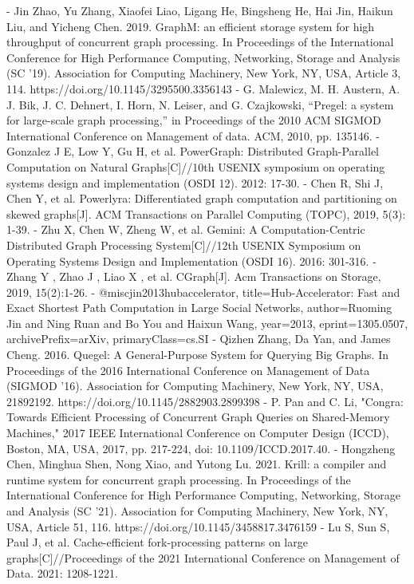 \documentclass[lettersize,journal]{IEEEtran} %
\begin{document}
- Jin Zhao, Yu Zhang, Xiaofei Liao, Ligang He, Bingsheng He, Hai Jin, Haikun Liu, and Yicheng Chen. 2019. GraphM: an efficient storage system for high throughput of concurrent graph processing. In Proceedings of the International Conference for High Performance Computing, Networking, Storage and Analysis (SC '19). Association for Computing Machinery, New York, NY, USA, Article 3, 114. https://doi.org/10.1145/3295500.3356143
- G. Malewicz, M. H. Austern, A. J. Bik, J. C. Dehnert, I. Horn, N. Leiser, and G. Czajkowski, “Pregel: a system for large-scale graph processing,” in Proceedings of the 2010 ACM SIGMOD International Conference on Management of data. ACM, 2010, pp. 135146.
- Gonzalez J E, Low Y, Gu H, et al. {PowerGraph}: Distributed {Graph-Parallel} Computation on Natural Graphs[C]//10th USENIX symposium on operating systems design and implementation (OSDI 12). 2012: 17-30.
- Chen R, Shi J, Chen Y, et al. Powerlyra: Differentiated graph computation and partitioning on skewed graphs[J]. ACM Transactions on Parallel Computing (TOPC), 2019, 5(3): 1-39.
- Zhu X, Chen W, Zheng W, et al. Gemini: A {Computation-Centric} Distributed Graph Processing System[C]//12th USENIX Symposium on Operating Systems Design and Implementation (OSDI 16). 2016: 301-316.
- Zhang Y ,  Zhao J ,  Liao X , et al. CGraph[J]. Acm Transactions on Storage, 2019, 15(2):1-26.
- @misc{jin2013hubaccelerator,
      title={Hub-Accelerator: Fast and Exact Shortest Path Computation in Large Social Networks},
      author={Ruoming Jin and Ning Ruan and Bo You and Haixun Wang},
      year={2013},
      eprint={1305.0507},
      archivePrefix={arXiv},
      primaryClass={cs.SI}
}
- Qizhen Zhang, Da Yan, and James Cheng. 2016. Quegel: A General-Purpose System for Querying Big Graphs. In Proceedings of the 2016 International Conference on Management of Data (SIGMOD '16). Association for Computing Machinery, New York, NY, USA, 21892192. https://doi.org/10.1145/2882903.2899398
- P. Pan and C. Li, "Congra: Towards Efficient Processing of Concurrent Graph Queries on Shared-Memory Machines," 2017 IEEE International Conference on Computer Design (ICCD), Boston, MA, USA, 2017, pp. 217-224, doi: 10.1109/ICCD.2017.40.
- Hongzheng Chen, Minghua Shen, Nong Xiao, and Yutong Lu. 2021. Krill: a compiler and runtime system for concurrent graph processing. In Proceedings of the International Conference for High Performance Computing, Networking, Storage and Analysis (SC '21). Association for Computing Machinery, New York, NY, USA, Article 51, 116. https://doi.org/10.1145/3458817.3476159
- Lu S, Sun S, Paul J, et al. Cache-efficient fork-processing patterns on large graphs[C]//Proceedings of the 2021 International Conference on Management of Data. 2021: 1208-1221.
\end{document}
